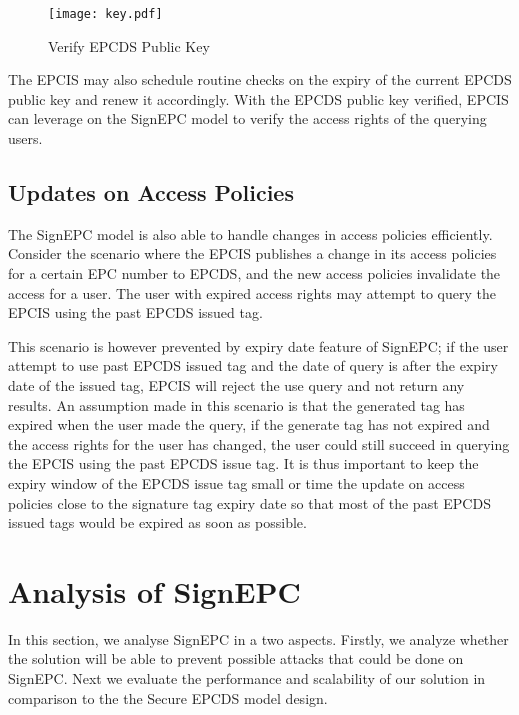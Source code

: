 \documentclass[conference]{IEEEtran}
\begin{document}
\begin{figure}[h]
\begin{center}
\texttt{[image: key.pdf]}
\caption{Verify EPCDS Public Key \label{fig:key}}
\end{center}
\end{figure}

The EPCIS may also schedule routine checks on the expiry of the current EPCDS public key and renew it accordingly. With the EPCDS public key verified, EPCIS can leverage on the SignEPC model to verify the access rights of the querying users.

\subsection {Updates on Access Policies}
The SignEPC model is also able to handle changes in access policies efficiently. Consider the scenario where the EPCIS publishes a change in its access policies for a certain EPC number to EPCDS, and the new access policies invalidate the access for a user. The user with expired access rights may attempt to query the EPCIS using the past EPCDS issued tag. 

This scenario is however prevented by expiry date feature of SignEPC; if the user attempt to use past EPCDS issued tag and the date of query is after the expiry date of the issued tag, EPCIS will reject the use query and not return any results. An assumption made in this scenario is that the generated tag has expired when the user made the query, if the generate tag has not expired and the access rights for the user has changed, the user could still succeed in querying the EPCIS using the past EPCDS issue tag. It is thus important to keep the expiry window of the EPCDS issue tag small or time the update on access policies close to the signature tag expiry date so that most of the past EPCDS issued tags would be expired as soon as possible. 

\section {Analysis of SignEPC}
\label{sec:analysis}
In this section, we analyse SignEPC in a two aspects. Firstly, we analyze whether the solution will be able to prevent possible attacks that could be done on SignEPC. Next we evaluate the performance and scalability of our solution in comparison to the the Secure EPCDS model design. 
\end{document}
